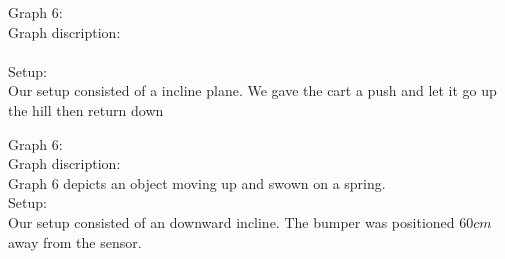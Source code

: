 \documentclass[11pt, letterpaper, includehead]{article}
\begin{document}
  \large{Graph 6:}\\
  \large{Graph discription:}\\
  \\
  \large{Setup:}\\
  Our setup consisted of a incline plane. We gave the cart a push and let it go up the hill then return down

  \large{Graph 6:}\\
  \large{Graph discription:}\\
  Graph 6 depicts an object moving up and swown on a spring.\\
  \large{Setup:}\\
  Our setup consisted of an downward incline. The bumper was positioned $60cm$ away from the sensor.  









\end{document}
